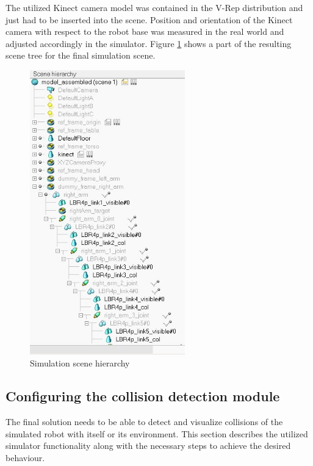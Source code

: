 The utilized Kinect camera model was contained in the V-Rep distribution and just had to be inserted into the scene. Position and orientation of the Kinect camera with respect to the robot base was measured in the real world and adjusted accordingly in the simulator. Figure \ref{fig:sim_scene_tree} shows a part of the resulting scene tree for the final simulation scene. 
\begin{figure}[h]
	\centering
  	\includegraphics[width=0.6\textwidth]{images/scene_tree.jpg}
	\caption{Simulation scene hierarchy}
	\label{fig:sim_scene_tree}
\end{figure}

\subsection{Configuring the collision detection module}
\label{sec:config_col}

The final solution needs to be able to detect and visualize collisions of the simulated robot with itself or its environment. This section describes the utilized simulator functionality along with the necessary steps to achieve the desired behaviour. \\


